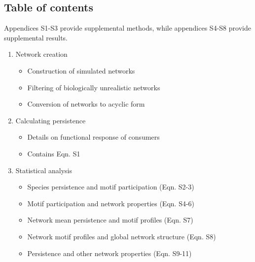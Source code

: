 \documentclass[12pt]{article}
\begin{document}
\setlength{\parindent}{15pt} 
\begin{spacing}{2.0}

\clearpage

\section*{Table of contents}
    \begin{spacing}{1.0}

    Appendices S1-S3 provide supplemental methods, while appendices S4-S8 provide supplemental results.

    \begin{enumerate}
    
        \item Network creation \\
        
            \begin{itemize}
            \item Construction of simulated networks
            \item Filtering of biologically unrealistic networks 
            \item Conversion of networks to acyclic form
            \end{itemize}
            
            
        \item Calculating persistence

            \begin{itemize}
                \item Details on functional response of consumers
                \item Contains Eqn. S1
            \end{itemize}    
            
        
         \item Statistical analysis

            \begin{itemize}
                \item Species persistence and motif participation (Eqn. S2-3)
                \item Motif participation and network properties (Eqn. S4-6)
                \item Network mean persistence and motif profiles (Eqn. S7)
                \item Network motif profiles and global network structure (Eqn. S8)
                \item Persistence and other network properties (Eqn. S9-11)
            \end{itemize}
                

\end{enumerate}
\end{spacing}
\end{spacing}
\end{document}
